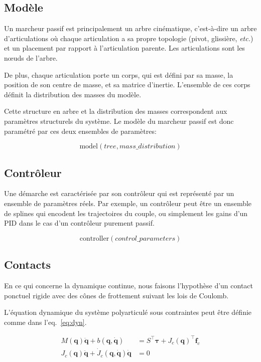 \documentclass[french,A4paper,]{book}
\begin{document}
\subsection{Modèle}\label{moduxe8le}

Un marcheur passif est principalement un arbre cinématique, c'est-à-dire
un arbre d'articulations où chaque articulation a sa propre topologie
(pivot, glissière, \emph{etc.}) et un placement par rapport à
l'articulation parente. Les articulations sont les nœuds de l'arbre.

De plus, chaque articulation porte un corps, qui est défini par sa
masse, la position de son centre de masse, et sa matrice d'inertie.
L'ensemble de ces corps définit la distribution des masses du modèle.

Cette structure en arbre et la distribution des masses correspondent aux
paramètres structurels du système. Le modèle du marcheur passif est donc
paramétré par ces deux ensembles de paramètres:

\[ \text{model} (\textit{tree}, \textit{mass\_distribution}) \]

\subsection{Contrôleur}\label{contruxf4leur}

Une démarche est caractérisée par son contrôleur qui est représenté par
un ensemble de paramètres réels. Par exemple, un contrôleur peut être un
ensemble de splines qui encodent les trajectoires du couple, ou
simplement les gains d'un PID dans le cas d'un contrôleur purement
passif.

\[ \text{controller} (\textit{control\_parameters}) \]

\subsection{Contacts}\label{sec:contcont}

En ce qui concerne la dynamique continue, nous faisons l'hypothèse d'un
contact ponctuel rigide avec des cônes de frottement suivant les lois de
Coulomb.

L'équation dynamique du système polyarticulé sous contraintes peut être
définie comme dans l'eq.~\ref{eq:dyn}.

\begin{equation} \begin{aligned}
    M(\bm q) \bm{\ddot q} + b(\bm q, \bm{\dot q}) &= S^\top \bm \tau + J_c(\bm q)^\top \bm f_c \\
    J_c(\bm q) \bm{\ddot q} + \dot J_c(\bm q, \bm{\dot q}) \bm{\dot q} &= 0
\end{aligned} \label{eq:dyn}\end{equation}
\end{document}
